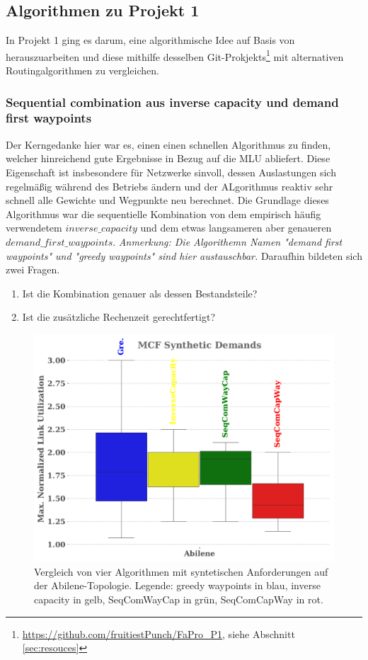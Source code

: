 \documentclass[sigconf, nonacm, review]{acmart}
\begin{document}
\subsection{Algorithmen zu Projekt 1}
In Projekt 1 ging es darum, eine algorithmische Idee auf Basis von \cite{foerster2021} herauszuarbeiten und diese mithilfe desselben Git-Prokjekts\footnote{\url{https://github.com/fruitiestPunch/FaPro_P1}, siehe Abschnitt \ref{sec:resouces}} mit alternativen Routingalgorithmen zu vergleichen. 
\subsubsection{Sequential combination aus inverse capacity und demand first waypoints}
Der Kerngedanke hier war es, einen einen schnellen Algorithmus zu finden, 
welcher hinreichend gute Ergebnisse in Bezug auf die MLU abliefert.
Diese Eigenschaft ist insbesondere f\"ur Netzwerke sinvoll,
dessen Auslastungen sich regelm\"a\ss ig w\"ahrend des Betriebs \"andern und der ALgorithmus reaktiv sehr schnell alle Gewichte und Wegpunkte neu berechnet.\newline
Die Grundlage dieses Algorithmus war die sequentielle Kombination von dem empirisch h\"aufig verwendetem $inverse\_capacity$ und dem etwas langsameren aber genaueren $demand\_first\_waypoints$.
\emph{Anmerkung: Die Algorithemn Namen "demand first waypoints" und "greedy waypoints" sind hier austauschbar.}\newline
Daraufhin bildeten sich zwei Fragen.
\begin{enumerate}
    \item Ist die Kombination genauer als dessen Bestandsteile?
    \item Ist die zus\"atzliche Rechenzeit gerechtfertigt?
\end{enumerate}
\begin{figure}
\centering
\includegraphics[width=\linewidth]{figures/pouria_all_algorithms_abilene.pdf}
\caption{Vergleich von vier Algorithmen mit syntetischen Anforderungen auf der Abilene-Topologie. Legende: greedy waypoints in blau, inverse capacity in gelb, SeqComWayCap in gr\"un, SeqComCapWay in rot.}
\label{fig:pouriaBoxplotSynthetic}
\end{figure}
\end{document}
